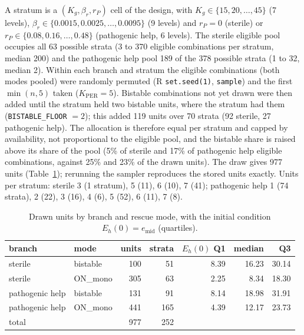 \documentclass[11pt]{article}
\begin{document}
A stratum is a $(K_g, \beta_r, r_P)$ cell of the design, with
$K_g \in \{15, 20, \dots, 45\}$ (7 levels), $\beta_r \in
\{0.0015, 0.0025, \dots, 0.0095\}$ (9 levels) and $r_P = 0$ (sterile) or
$r_P \in \{0.08, 0.16, \dots, 0.48\}$ (pathogenic help, 6 levels). The sterile
eligible pool occupies all 63 possible strata (3 to 370 eligible combinations
per stratum, median 200) and the pathogenic help pool 189 of the 378 possible
strata (1 to 32, median 2). Within each branch and stratum the eligible
combinations (both modes pooled) were randomly permuted (R
\texttt{set.seed(1)}, \texttt{sample}) and the first $\min(n, 5)$ taken
($K_{\mathrm{PER}} = 5$). Bistable combinations not yet drawn were then added
until the stratum held two bistable units, where the stratum had them
(\texttt{BISTABLE\_FLOOR} $= 2$); this added 119 units over 70 strata (92
sterile, 27 pathogenic help). The allocation is therefore equal per stratum
and capped by availability, not proportional to the eligible pool, and the
bistable share is raised above its share of the pool (5\% of sterile and 17\%
of pathogenic help eligible combinations, against 25\% and 23\% of the drawn
units). The draw gives 977 units (Table~\ref{tab:imp-draw}); rerunning the
sampler reproduces the stored units exactly. Units per stratum: sterile 3 (1
stratum), 5 (11), 6 (10), 7 (41); pathogenic help 1 (74 strata), 2 (22), 3
(16), 4 (6), 5 (52), 6 (11), 7 (8).

\begin{table}[H]
\centering
\caption{Drawn units by branch and rescue mode, with the initial condition
$E_h(0) = e_{\mathrm{mid}}$ (quartiles).}
\label{tab:imp-draw}
\begin{tabular}{llrrrrr}
\toprule
branch & mode & units & strata & $E_h(0)$ Q1 & median & Q3\\
\midrule
sterile         & bistable & 100 &  51 & 8.39 & 16.23 & 30.14\\
sterile         & ON\_mono & 305 &  63 & 2.25 &  8.34 & 18.30\\
pathogenic help & bistable & 131 &  91 & 8.14 & 18.98 & 31.91\\
pathogenic help & ON\_mono & 441 & 165 & 4.39 & 12.17 & 23.73\\
\midrule
total           &          & 977 & 252 &      &       &      \\
\bottomrule
\end{tabular}
\end{table}
\end{document}
